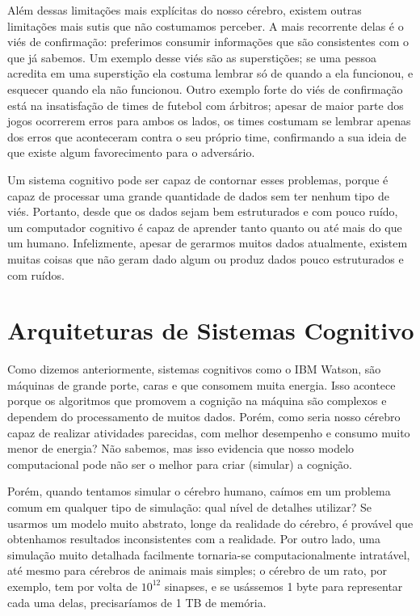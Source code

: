 \documentclass[12pt]{article}
\begin{document}
Além dessas limitações mais explícitas do nosso cérebro, existem outras
limitações mais sutis que não costumamos perceber. A mais recorrente 
delas é o viés de confirmação: preferimos consumir informações que são
consistentes com o que já sabemos. Um exemplo desse viés são as 
superstições; se uma pessoa acredita em uma superstição ela costuma
lembrar só de quando a ela funcionou, e esquecer quando ela
não funcionou. Outro exemplo forte do viés de confirmação está na 
insatisfação de times de futebol com árbitros; apesar de maior parte 
dos jogos ocorrerem erros para ambos os lados, os times costumam se
lembrar apenas dos erros que aconteceram contra o seu próprio time,
confirmando a sua ideia de que existe algum favorecimento para o 
adversário.

Um sistema cognitivo pode ser capaz de contornar esses problemas, porque
é capaz de processar uma grande quantidade de dados sem ter nenhum tipo
de viés. Portanto, desde que os dados sejam bem estruturados e com pouco
ruído, um computador cognitivo é capaz de aprender tanto quanto ou até
mais do que um humano. Infelizmente, apesar de gerarmos muitos dados 
atualmente, existem muitas coisas que não geram dado algum ou produz 
dados pouco estruturados e com ruídos.

\section{Arquiteturas de Sistemas Cognitivo}
Como dizemos anteriormente, sistemas cognitivos como o IBM Watson, 
são máquinas de grande porte, caras e que consomem muita energia. Isso
acontece porque os algoritmos que promovem a cognição na máquina são
complexos e dependem do processamento de muitos dados. Porém, como seria
nosso cérebro capaz de realizar atividades parecidas, com melhor 
desempenho e consumo muito menor de energia? Não sabemos, mas isso 
evidencia que nosso modelo computacional pode não ser o melhor para 
criar (simular) a cognição.

Porém, quando tentamos simular o cérebro humano, caímos em um problema
comum em qualquer tipo de simulação: qual nível de detalhes utilizar?
Se usarmos um modelo muito abstrato, longe da realidade do cérebro, é
provável que obtenhamos resultados inconsistentes com a realidade. 
Por outro lado, uma simulação muito detalhada facilmente tornaria-se
computacionalmente intratável, até mesmo para cérebros de animais mais 
simples; o cérebro de um rato, por exemplo, tem por volta de $10^{12}$ 
sinapses, e se usássemos 1 byte para representar cada uma delas, 
precisaríamos de 1 TB de memória.
\end{document}
